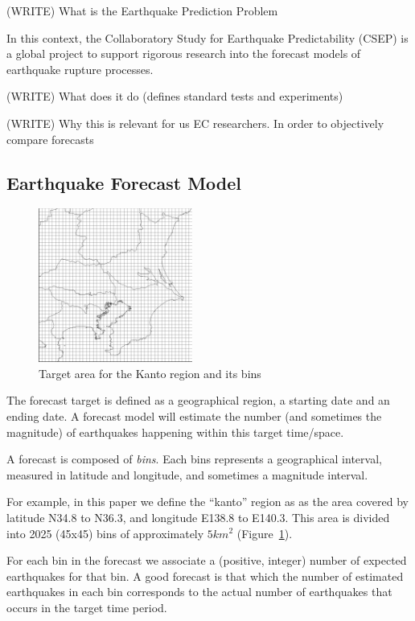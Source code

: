 \documentclass{sig-alternate}
\begin{document}
(WRITE) What is the Earthquake Prediction Problem

In this context, the Collaboratory Study for Earthquake Predictability
(CSEP) is a global project to support rigorous research into the
forecast models of earthquake rupture processes.  

(WRITE) What does it do (defines standard tests and experiments)

(WRITE) Why this is relevant for us EC researchers.
In order to objectively compare forecasts 

\subsection{Earthquake Forecast Model}\label{CSEP_definition} 

\begin{figure}
  \begin{center}
    \includegraphics[width=0.45\textwidth]{img/kantomap.png}
  \end{center}
  \caption{Target area for the Kanto region and its bins}
  \label{fig:kantomap}
\end{figure}

The forecast target is defined as a geographical region, a starting
date and an ending date. A forecast model will estimate the number
(and sometimes the magnitude) of earthquakes happening within this
target time/space.

A forecast is composed of \emph{bins}. Each bins represents a
geographical interval, measured in latitude and longitude, and
sometimes a magnitude interval. 

For example, in this paper we define the ``kanto'' region as as the
area covered by latitude N34.8 to N36.3, and longitude E138.8 to
E140.3. This area is divided into 2025 (45x45) bins of approximately
$5km^2$ (Figure~\ref{fig:kantomap}).

For each bin in the forecast we associate a (positive, integer) number
of expected earthquakes for that bin. A good forecast is that which
the number of estimated earthquakes in each bin corresponds to the
actual number of earthquakes that occurs in the target time period.
\end{document}
